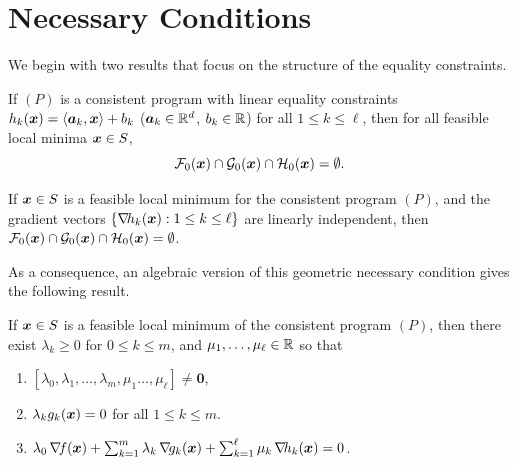 \section{Necessary Conditions}
We begin with two results that focus on the structure of the equality constraints.
\begin{theorem}
If $(P)$ is a consistent program with linear equality constraints $h_k(\boldsymbol{x}) = \langle \boldsymbol{a}_k, \boldsymbol{x} \rangle + b_k$ ($\boldsymbol{a}_k \in \mathbb{R}^d$, $b_k \in \mathbb{R}$) for all $1 \leq k \leq \ell$, then for all feasible local minima $\boldsymbol{x} \in S$,
\begin{equation*}
\mathcal{F}_0(\boldsymbol{x}) \cap \mathcal{G}_0(\boldsymbol{x}) \cap \mathcal{H}_0(\boldsymbol{x}) = \emptyset.
\end{equation*}
\end{theorem}

\begin{theorem}
If $\boldsymbol{x} \in S$ is a feasible local minimum for the consistent program $(P)$, and the gradient vectors $\{ \mathop{\nabla\! {h_k}}(\boldsymbol{x}) : 1 \leq k \leq \ell \}$ are linearly independent, then $\mathcal{F}_0(\boldsymbol{x}) \cap \mathcal{G}_0(\boldsymbol{x}) \cap \mathcal{H}_0(\boldsymbol{x}) = \emptyset$.
\end{theorem}

\separator

As a consequence, an algebraic version of this geometric necessary condition gives the following result.

\begin{theorem}\label{theorem:FritzJohn}
If $\boldsymbol{x} \in S$ is a feasible local minimum of the consistent program $(P)$, then there exist $\lambda_k \geq 0$ for $0\leq k \leq m$, and $\mu_1, \dots, \mu_\ell \in \mathbb{R}$ so that
\begin{enumerate}
 	\item $[\lambda_0, \lambda_1, \dotsc, \lambda_m, \mu_1 \dotsc, \mu_\ell ] \neq \boldsymbol{0}$,
 	\item $\lambda_k g_k(\boldsymbol{x}) = 0$ for all $1 \leq k \leq m$.
 	\item $\lambda_0 \mathop{\nabla\! {f}}(\boldsymbol{x}) + \sum_{k=1}^m \lambda_k \mathop{\nabla\! {g_k}}(\boldsymbol{x}) + \sum_{k=1}^\ell \mu_k \mathop{\nabla\! {h_k}}(\boldsymbol{x}) = 0$.
 \end{enumerate}
\end{theorem}

